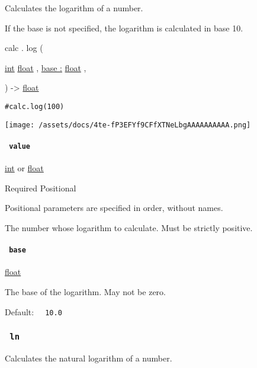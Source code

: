 Calculates the logarithm of a number.

If the base is not specified, the logarithm is calculated in base 10.

calc { . } { log } (

{ \href{/docs/reference/foundations/int/}{int}
\href{/docs/reference/foundations/float/}{float} , } {
\hyperref[functions-log-parameters-base]{base :}
\href{/docs/reference/foundations/float/}{float} , }

) -\textgreater{} \href{/docs/reference/foundations/float/}{float}

\begin{verbatim}
#calc.log(100)
\end{verbatim}

\texttt{[image: /assets/docs/4te-fP3EFYf9CFfXTNeLbgAAAAAAAAAA.png]}

\paragraph{\texorpdfstring{\texttt{\ value\ }}{ value }}\label{functions-log-value}

\href{/docs/reference/foundations/int/}{int} {or}
\href{/docs/reference/foundations/float/}{float}

{Required} {{ Positional }}

\label{functions-log-value-positional-tooltip}
Positional parameters are specified in order, without names.

The number whose logarithm to calculate. Must be strictly positive.

\paragraph{\texorpdfstring{\texttt{\ base\ }}{ base }}\label{functions-log-base}

\href{/docs/reference/foundations/float/}{float}

The base of the logarithm. May not be zero.

Default: \texttt{\ }{\texttt{\ 10.0\ }}\texttt{\ }

\subsubsection{\texorpdfstring{\texttt{\ ln\ }}{ ln }}\label{functions-ln}

Calculates the natural logarithm of a number.

